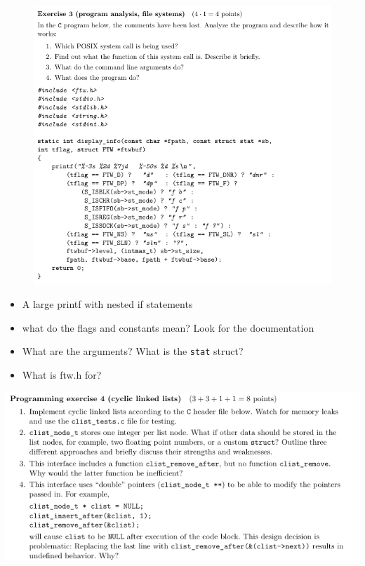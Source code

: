 \documentclass[10pt]{beamer}
\begin{document}
\begin{frame}{}
            \begin{figure}
                \includegraphics[keepaspectratio, width=\textwidth, height=\textheight-2\baselineskip-2\baselineskip]{img/ex9_102.png} \\
            \end{figure}
            \framebreak
            \begin{itemize}
                \item A large printf with nested if statements
                \item what do the flags and constants mean? Look for the documentation
                \item What are the arguments? What is the \texttt{stat} struct?
                \item What is ftw.h for?
            \end{itemize}
            \framebreak
            \includegraphics[keepaspectratio, width=\textwidth, height=\textheight]{img/ex9_103_0.png} \\

\end{frame}
\end{document}
